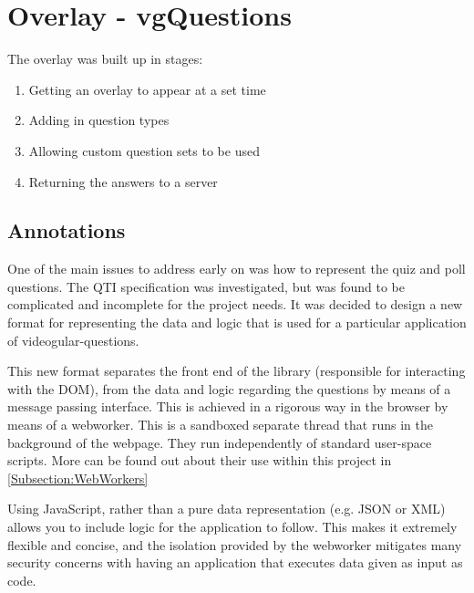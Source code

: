 \chapter{Overlay - vgQuestions} \label{Chapter:Overlay}

The overlay was built up in stages:
\begin{enumerate}
\item Getting an overlay to appear at a set time
\item Adding in question types
\item Allowing custom question sets to be used
\item Returning the answers to a server
\end{enumerate}

\section{Annotations}
\label{Section:Annotations}

One of the main issues to address early on was how to represent the quiz and
poll questions. The \gls{QTI} specification was
investigated, but was found to be complicated and incomplete  for the project needs. It was decided to design a new
format for representing the data and logic that is used for a particular
application of videogular-questions.

This new format separates the front end of the library (responsible for
interacting with the \gls{DOM}), from the data and logic regarding the questions by
means of a message passing interface. This is achieved in a rigorous way in the
browser by means of a \gls{webworker}. This is a sandboxed separate thread that runs
in the background of the webpage. They run independently of standard user-space
scripts.  More can be found out about their use within this project in \autoref{Subsection:WebWorkers}

Using JavaScript, rather than a pure data representation (e.g. JSON or XML)
allows you to include logic for the application to follow. This makes it extremely
flexible and concise, and the isolation provided by the \gls{webworker} mitigates
many security concerns with having an application that executes data given as
input as code.

